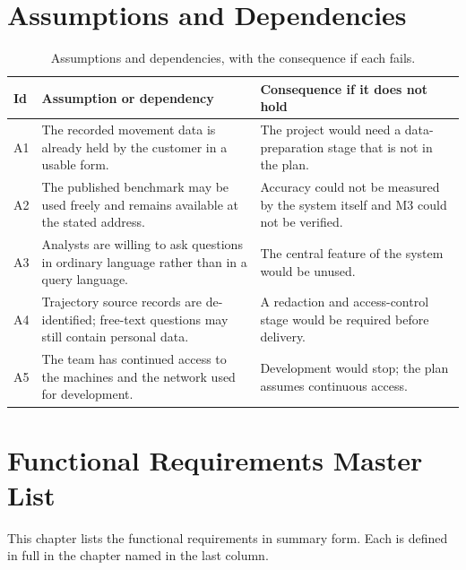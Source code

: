 \documentclass[12pt,a4paper]{report}
\begin{document}
\chapter{Assumptions and Dependencies}
\label{ch:assumptions}

\begin{table}[H]
  \centering
  \caption{Assumptions and dependencies, with the consequence if each fails.}
  \label{tab:assumptions}
  \begin{tabular}{@{}p{0.9cm} >{\raggedright\arraybackslash}p{6.4cm} >{\raggedright\arraybackslash}p{6.6cm}@{}}
    \toprule[1.5pt]
    \textbf{Id} & \textbf{Assumption or dependency} &
      \textbf{Consequence if it does not hold} \\
    \midrule
    A1 & The recorded movement data is already held by the customer in a
      usable form. & The project would need a data-preparation stage that
      is not in the plan. \\
    \addlinespace
    A2 & The published benchmark may be used freely and remains available
      at the stated address. & Accuracy could not be measured by the
      system itself and M3 could not be verified. \\
    \addlinespace
    A3 & Analysts are willing to ask questions in ordinary language rather
      than in a query language. & The central feature of the system would
      be unused. \\
    \addlinespace
    A4 & Trajectory source records are de-identified; free-text questions
      may still contain personal data. & A redaction and access-control
      stage would be required before delivery. \\
    \addlinespace
    A5 & The team has continued access to the machines and the network
      used for development. & Development would stop; the plan assumes
      continuous access. \\
    \bottomrule[1.5pt]
  \end{tabular}
\end{table}

\chapter{Functional Requirements Master List}
\label{ch:master}

This chapter lists the functional requirements in summary form. Each is
defined in full in the chapter named in the last column.
\end{document}
